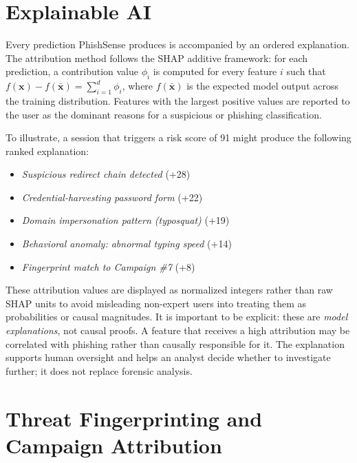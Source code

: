 \documentclass[conference]{IEEEtran}
\begin{document}
\section{Explainable AI}

Every prediction PhishSense produces is accompanied by an ordered explanation.
The attribution method follows the SHAP additive framework: for each prediction, a contribution
value $\phi_i$ is computed for every feature $i$ such that
$f(\mathbf{x}) - f(\bar{\mathbf{x}}) = \sum_{i=1}^{d}\phi_i$,
where $f(\bar{\mathbf{x}})$ is the expected model output across the training distribution.
Features with the largest positive values are reported to the user as the dominant reasons for a
suspicious or phishing classification.

To illustrate, a session that triggers a risk score of 91 might produce the following
ranked explanation:
\begin{itemize}[nosep,leftmargin=*]
\item \textit{Suspicious redirect chain detected} \hfill (+28)
\item \textit{Credential-harvesting password form} \hfill (+22)
\item \textit{Domain impersonation pattern (typosquat)} \hfill (+19)
\item \textit{Behavioral anomaly: abnormal typing speed} \hfill (+14)
\item \textit{Fingerprint match to Campaign \#7} \hfill (+8)
\end{itemize}

These attribution values are displayed as normalized integers rather than raw SHAP units to avoid
misleading non-expert users into treating them as probabilities or causal magnitudes.
It is important to be explicit: these are \textit{model explanations}, not causal proofs.
A feature that receives a high attribution may be correlated with phishing rather than causally
responsible for it.
The explanation supports human oversight and helps an analyst decide whether to investigate
further; it does not replace forensic analysis.

\section{Threat Fingerprinting and Campaign Attribution}
\end{document}
